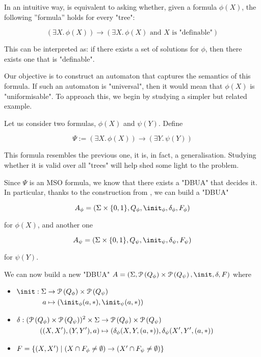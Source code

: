 \documentclass[a4paper,UKenglish,cleveref, autoref, thm-restate]{lipics-v2021}
\begin{document}
In an intuitive way,  is equivalent to asking whether,
given a formula $\phi(X)$, the following ''formula'' holds for every "tree":

\[
	(\exists X.\, \phi(X)) \rightarrow (\exists X.\, \phi(X) \text{ and $X$ is "definable"})
\]

This can be interpreted as: if there exists a set of solutions for $\phi$, then there exists one that is "definable".

Our objective is to construct an automaton that captures the semantics of this formula. If such an automaton is "universal",
then it would mean that $\phi(X)$ is "uniformisable". To approach this, we begin by studying a simpler but related example.

Let us consider two formulas, $\phi(X)$ and $\psi(Y)$. Define

\[
	\Psi := (\exists X.\, \phi(X)) \rightarrow (\exists Y.\, \psi(Y))
\]

This formula resembles the previous one, it is, in fact, a generalisation. Studying whether it is valid over all "trees" will
help shed some light to the problem.

Since $\Psi$ is an MSO formula, we know that there exists a "DBUA" that decides it. In particular, thanks to the
construction from , we can build a "DBUA"

\[
	A_{\phi} = (\Sigma \times \{0,1\}, Q_{\phi}, \init_{\phi}, \delta_{\phi}, F_{\phi})
\]

for $\phi(X)$, and another one

\[
	A_{\psi} = (\Sigma \times \{0,1\}, Q_{\psi}, \init_{\psi}, \delta_{\psi}, F_{\psi})
\]

for $\psi(Y)$.


We can now build a new "DBUA" $A = (\Sigma, \parts {Q_{\phi}} \times \parts {Q_{\psi}}, \init, \delta, F)$ where

\begin{itemize}
	\item$\begin{aligned}[t]
			      \init : \Sigma & \to      \parts {Q_{\phi}} \times \parts {Q_{\psi}} \\
			      a              & \mapsto  ( \init_{\phi}(a,*) , \init_{\psi}(a,*))
		      \end{aligned}$

	\item$\begin{aligned}[t]
			      \delta : (\mathcal{P}\left(Q_{\phi}\right) \times \mathcal{P}\left(Q_{\psi}\right))^2 \times \Sigma & \to      \mathcal{P}\left(Q_{\phi}\right) \times \mathcal{P}\left(Q_{\psi}\right)           \\
			      ((X,X'),(Y,Y'),a)                                                     & \mapsto (\delta_{\phi}(X,Y,(a,*)), \delta_{\psi}(X',Y',(a,*))
		      \end{aligned}$

	\item $F = \left\{(X,X') \mid (X \cap F_{\phi} \neq \emptyset) \rightarrow (X' \cap F_{\psi} \neq \emptyset)\right\}$
\end{itemize}
\end{document}
